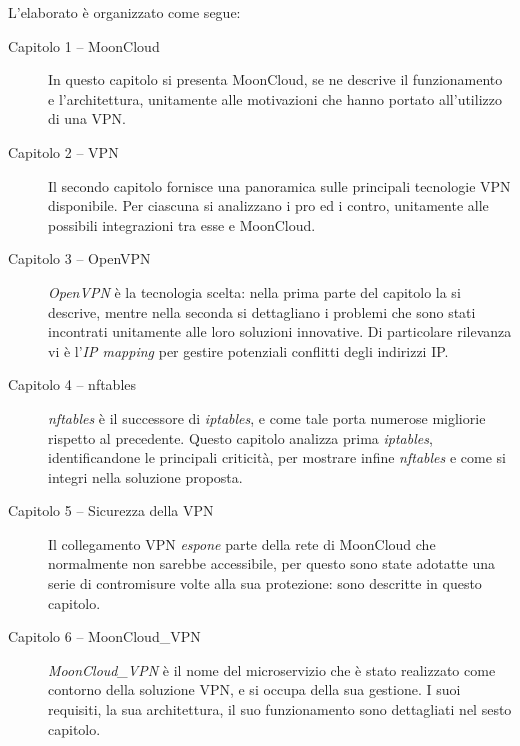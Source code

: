 L'elaborato è organizzato come segue:
\begin{description}
    \item[Capitolo 1 -- MoonCloud] In questo capitolo si presenta MoonCloud, se ne
    descrive il funzionamento e l'architettura, unitamente
    alle motivazioni che hanno portato all'utilizzo di una VPN.
    \item[Capitolo 2 -- VPN] Il secondo capitolo fornisce una panoramica sulle
    principali tecnologie VPN disponibile. Per ciascuna si analizzano
    i pro ed i contro, unitamente alle possibili integrazioni tra esse e MoonCloud.
    \item[Capitolo 3 -- OpenVPN] \textit{OpenVPN} è la tecnologia scelta: nella
    prima parte del capitolo la si descrive, mentre nella seconda si dettagliano
    i problemi che sono stati incontrati unitamente alle loro soluzioni innovative.
    Di particolare rilevanza vi è l'\textit{IP mapping} per gestire potenziali conflitti degli
    indirizzi IP.
    \item[Capitolo 4 -- nftables] \textit{nftables} è il successore di \textit{iptables},
    e come tale porta numerose migliorie rispetto al precedente. Questo capitolo analizza
    prima \textit{iptables}, identificandone le principali criticità, per mostrare
    infine \textit{nftables} e come si integri nella soluzione proposta.
    \item[Capitolo 5 -- Sicurezza della VPN] Il collegamento VPN \textit{espone}
    parte della rete di MoonCloud che normalmente non sarebbe accessibile, per questo
    sono state adotatte una serie di contromisure volte alla sua protezione: sono descritte
    in questo capitolo.
    \item[Capitolo 6 -- MoonCloud\_VPN] \textit{MoonCloud\_VPN} è il nome del
    microservizio che è stato realizzato come contorno della soluzione VPN, e si
    occupa della sua gestione. I suoi requisiti, la sua architettura, il suo
    funzionamento sono dettagliati nel sesto capitolo.
\end{description}